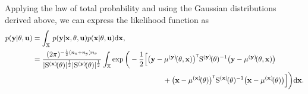 %
Applying  the law of total probability and using the Gaussian distributions derived above, we can express the likelihood function as
\begin{equation}\label{eq: likelihoog int}
\begin{split}
        p(\mathbf{y}|\vctheta, \mathbf{u})
        & =
        \int_{\Xbb}
        \,
        p(\mathbf{y}|\mathbf{x}, \vctheta, \mathbf{u})p(\mathbf{x}|\vctheta, \mathbf{u}) \drm \mathbf{x}, 
        \\&= 
        \frac{(2\pi)^{-\frac{1}{2}(\Nx+\Ny)\nsD}}{|\Sbfxtheta|^{\frac{1}{2}} |\Sbfytheta|^{\frac{1}{2}}} \int_{\Xbb} 
        \exp 
        \bigg( -\frac{1}{2} \Big[ 
        \big(\mathbf{y}-\mubfythetax \big)^\tr
        \mxS^{{(\mathbf{y})}}\!(\vctheta)^{-1}
        \big( \mathbf{y}-\mubfythetax \big) \\
        &
        \qquad\qquad \qquad\qquad \qquad\qquad \qquad\qquad \qquad 
        + 
        \big(\mathbf{x}-\mubfxtheta \big)^\tr
        \mxS^{{(\mathbf{x})}}\!(\vctheta)^{-1}
        \big( \mathbf{x}-\mubfxtheta \big) 
        \Big] \bigg) 
        \drm \mathbf{x}.
\end{split}
\end{equation}
